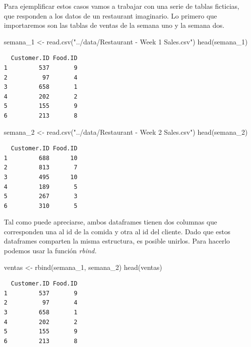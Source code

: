 \documentclass[
  letterpaper,
  DIV=11,
  numbers=noendperiod]{scrreprt}
\newenvironment{Shaded}{\begin{snugshade}}{\end{snugshade}}
\newcommand{\FunctionTok}[1]{\textcolor[rgb]{0.28,0.35,0.67}{#1}}
\newcommand{\NormalTok}[1]{\textcolor[rgb]{0.00,0.23,0.31}{#1}}
\newcommand{\OtherTok}[1]{\textcolor[rgb]{0.00,0.23,0.31}{#1}}
\newcommand{\StringTok}[1]{\textcolor[rgb]{0.13,0.47,0.30}{#1}}
\begin{document}
Para ejemplificar estos casos vamos a trabajar con una serie de tablas
ficticias, que responden a los datos de un restaurant imaginario. Lo
primero que importaremos son las tablas de ventas de la semana uno y la
semana dos.

\begin{Shaded}
\begin{Highlighting}[]
\NormalTok{semana\_1 }\OtherTok{\textless{}{-}} \FunctionTok{read.csv}\NormalTok{(}\StringTok{"../data/Restaurant {-} Week 1 Sales.csv"}\NormalTok{)}
\FunctionTok{head}\NormalTok{(semana\_1)}
\end{Highlighting}
\end{Shaded}

\begin{verbatim}
  Customer.ID Food.ID
1         537       9
2          97       4
3         658       1
4         202       2
5         155       9
6         213       8
\end{verbatim}

\begin{Shaded}
\begin{Highlighting}[]
\NormalTok{semana\_2 }\OtherTok{\textless{}{-}} \FunctionTok{read.csv}\NormalTok{(}\StringTok{"../data/Restaurant {-} Week 2 Sales.csv"}\NormalTok{)}
\FunctionTok{head}\NormalTok{(semana\_2)}
\end{Highlighting}
\end{Shaded}

\begin{verbatim}
  Customer.ID Food.ID
1         688      10
2         813       7
3         495      10
4         189       5
5         267       3
6         310       5
\end{verbatim}

Tal como puede apreciarse, ambos dataframes tienen dos columnas que
corresponden una al id de la comida y otra al id del cliente. Dado que
estos dataframes comparten la misma estructura, es posible unirlos. Para
hacerlo podemos usar la función \emph{rbind.}

\begin{Shaded}
\begin{Highlighting}[]
\NormalTok{ventas }\OtherTok{\textless{}{-}} \FunctionTok{rbind}\NormalTok{(semana\_1, semana\_2)}
\FunctionTok{head}\NormalTok{(ventas)}
\end{Highlighting}
\end{Shaded}

\begin{verbatim}
  Customer.ID Food.ID
1         537       9
2          97       4
3         658       1
4         202       2
5         155       9
6         213       8
\end{verbatim}
\end{document}
